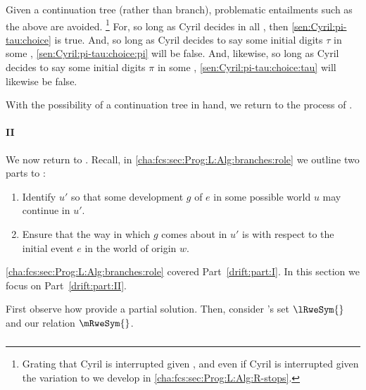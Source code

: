 \begin{note}
  Given a continuation tree (rather than branch), problematic entailments such as the above are avoided.%
  \footnote{
    Grating that Cyril is interrupted given \AlgGetStops{}, and even if Cyril is interrupted given the variation to \AlgGetStops{} we develop in \autoref{cha:fcs:sec:Prog:L:Alg:R-stops}.
  }
  For, so long as Cyril decides in all , then \ref{sen:Cyril:pi-tau:choice} is true.
  And, so long as Cyril decides to say some initial digits \(\tau\) in some , \ref{sen:Cyril:pi-tau:choice:pi} will be false.
  And, likewise, so long as Cyril decides to say some initial digits \(\pi\) in some , \ref{sen:Cyril:pi-tau:choice:tau} will likewise be false.
\end{note}

\begin{note}[Moving on]
  With the possibility of a continuation tree in hand, we return to the process of \drifting{}.
\end{note}

\paragraph{ II}
\label{cha:fcs:sec:Prog:L:Alg:branches:drift}

\begin{note}
  We now return to \drift{}.
  Recall, in \autoref{cha:fcs:sec:Prog:L:Alg:branches:role} we outline two parts to :
  \begin{enumerate}[label=\Roman*., ref=(\Roman*), noitemsep]
  \item
    Identify  \(u'\) so that some development \(g\) of \(e\) in some possible world \(u\) may continue in \(u'\).
  \item
    Ensure that the way in which \(g\) comes about in \(u'\) is \drAdj{} with respect to the initial event \(e\) in the world of origin \(w\).
  \end{enumerate}

  \autoref{cha:fcs:sec:Prog:L:Alg:branches:role} covered Part~\ref{drift:part:I}.
  In this section we focus on Part~\ref{drift:part:II}.

  First observe how  provide a partial solution.
  Then, consider \citeauthor{Landman:1992wh}'s set \(\lRweSym{}\) and our relation \(\mRweSym{}\).
\end{note}

\subparagraph{}
\label{cha:fcs:sec:Prog:L:Alg:branches:drift:close}

